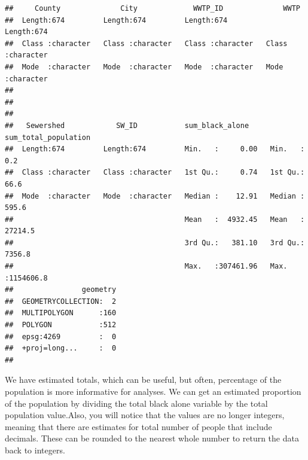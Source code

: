\documentclass[
]{book}
\newenvironment{Shaded}{\begin{snugshade}}{\end{snugshade}}
\newcommand{\AttributeTok}[1]{\textcolor[rgb]{0.77,0.63,0.00}{#1}}
\newcommand{\CommentTok}[1]{\textcolor[rgb]{0.56,0.35,0.01}{\textit{#1}}}
\newcommand{\FunctionTok}[1]{\textcolor[rgb]{0.00,0.00,0.00}{#1}}
\newcommand{\NormalTok}[1]{#1}
\newcommand{\OtherTok}[1]{\textcolor[rgb]{0.56,0.35,0.01}{#1}}
\newcommand{\SpecialCharTok}[1]{\textcolor[rgb]{0.00,0.00,0.00}{#1}}
\newcommand{\StringTok}[1]{\textcolor[rgb]{0.31,0.60,0.02}{#1}}
\begin{document}
\begin{verbatim}
##     County              City             WWTP_ID              WWTP          
##  Length:674         Length:674         Length:674         Length:674        
##  Class :character   Class :character   Class :character   Class :character  
##  Mode  :character   Mode  :character   Mode  :character   Mode  :character  
##                                                                             
##                                                                             
##                                                                             
##   Sewershed            SW_ID           sum_black_alone     sum_total_population
##  Length:674         Length:674         Min.   :     0.00   Min.   :      0.2   
##  Class :character   Class :character   1st Qu.:     0.74   1st Qu.:     66.6   
##  Mode  :character   Mode  :character   Median :    12.91   Median :    595.6   
##                                        Mean   :  4932.45   Mean   :  27214.5   
##                                        3rd Qu.:   381.10   3rd Qu.:   7356.8   
##                                        Max.   :307461.96   Max.   :1154606.8   
##                geometry  
##  GEOMETRYCOLLECTION:  2  
##  MULTIPOLYGON      :160  
##  POLYGON           :512  
##  epsg:4269         :  0  
##  +proj=long...     :  0  
## 
\end{verbatim}

We have estimated totals, which can be useful, but often, percentage of the population is more informative for analyses. We can get an estimated proportion of the population by dividing the total black alone variable by the total population value.Also, you will notice that the values are no longer integers, meaning that there are estimates for total number of people that include decimals. These can be rounded to the nearest whole number to return the data back to integers.

\begin{Shaded}
\end{Shaded}
\end{document}
